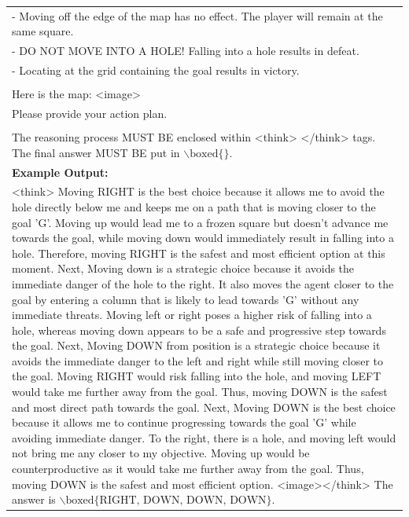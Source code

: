 \begin{table}[htbp]
{\begin{tabular}{p{\linewidth}}
        - Moving off the edge of the map has no effect. The player will remain at the same square. \\
        - DO NOT MOVE INTO A HOLE! Falling into a hole results in defeat. \\
        - Locating at the grid containing the goal results in victory. \\
        \\
        Here is the map: <image> \\
        Please provide your action plan. \\
        \\
        The reasoning process MUST BE enclosed within <think> </think> tags. The final answer MUST BE put in $\backslash \text{boxed}\{\}$.\\
        \midrule
        \textbf{Example Output:} \\
        <think> Moving RIGHT is the best choice because it allows me to avoid the hole directly below me and keeps me on a path that is moving closer to the goal 'G'. Moving up would lead me to a frozen square but doesn't advance me towards the goal, while moving down would immediately result in falling into a hole. Therefore, moving RIGHT is the safest and most efficient option at this moment. Next, Moving down is a strategic choice because it avoids the immediate danger of the hole to the right. It also moves the agent closer to the goal by entering a column that is likely to lead towards 'G' without any immediate threats. Moving left or right poses a higher risk of falling into a hole, whereas moving down appears to be a safe and progressive step towards the goal. Next, Moving DOWN from position is a strategic choice because it avoids the immediate danger to the left and right while still moving closer to the goal. Moving RIGHT would risk falling into the hole, and moving LEFT would take me further away from the goal. Thus, moving DOWN is the safest and most direct path towards the goal. Next, Moving DOWN is the best choice because it allows me to continue progressing towards the goal 'G' while avoiding immediate danger. To the right, there is a hole, and moving left would not bring me any closer to my objective. Moving up would be counterproductive as it would take me further away from the goal. Thus, moving DOWN is the safest and most efficient option. <image></think> The answer is $\backslash \text{boxed}\{\text{RIGHT, DOWN, DOWN, DOWN}\}$. \\
        \bottomrule
    \end{tabular}
    }
    \label{tab:data-example-navigation}
\end{table}

